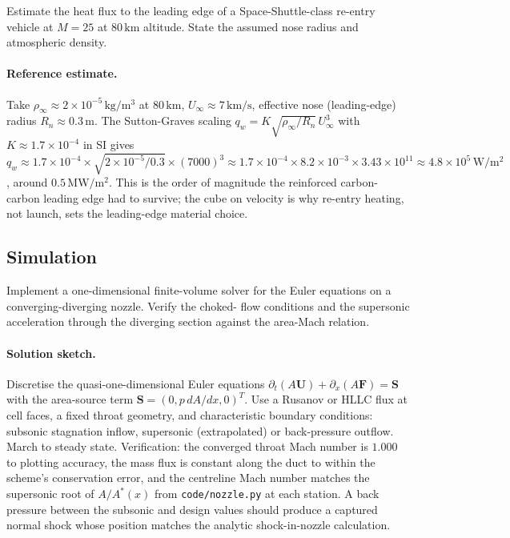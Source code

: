 \begin{exercise}
Estimate the heat flux to the leading edge of a Space-Shuttle-class
re-entry vehicle at $M = 25$ at $80\,\si{\kilo\meter}$ altitude.
State the assumed nose radius and atmospheric density.
\paragraph{Reference estimate.} Take $\rho_\infty \approx 2\times
10^{-5}\,\si{\kilogram\per\meter\cubed}$ at $80\,\si{\kilo\meter}$,
$U_\infty \approx 7\,\si{\kilo\meter\per\second}$, effective nose
(leading-edge) radius $R_n \approx 0.3\,\si{\meter}$. The Sutton-Graves
scaling $q_w = K\sqrt{\rho_\infty/R_n}\,U_\infty^3$ with $K \approx
1.7\times 10^{-4}$ in SI gives $q_w \approx 1.7\times 10^{-4}\times
\sqrt{2\times 10^{-5}/0.3}\times(7000)^3 \approx 1.7\times 10^{-4}
\times 8.2\times 10^{-3}\times 3.43\times 10^{11} \approx 4.8\times
10^{5}\,\si{\watt\per\meter\squared}$, around $0.5\,\si{\mega\watt\per
\meter\squared}$. This is the order of magnitude the reinforced
carbon-carbon leading edge had to survive; the cube on velocity is why
re-entry heating, not launch, sets the leading-edge material choice.
\end{exercise}

\subsection*{Simulation}

\begin{exercise}
Implement a one-dimensional finite-volume solver for the Euler
equations on a converging-diverging nozzle. Verify the choked-
flow conditions and the supersonic acceleration through the
diverging section against the area-Mach relation.
\paragraph{Solution sketch.} Discretise the quasi-one-dimensional
Euler equations $\partial_t(A\mathbf U) + \partial_x(A\mathbf F) =
\mathbf S$ with the area-source term $\mathbf S = (0, p\,dA/dx, 0)^T$.
Use a Rusanov or HLLC flux at cell faces, a fixed throat geometry, and
characteristic boundary conditions: subsonic stagnation inflow,
supersonic (extrapolated) or back-pressure outflow. March to steady
state. Verification: the converged throat Mach number is $1.000$ to
plotting accuracy, the mass flux is constant along the duct to within
the scheme's conservation error, and the centreline Mach number
matches the supersonic root of $A/A^*(x)$ from \texttt{code/nozzle.py}
at each station. A back pressure between the subsonic and design
values should produce a captured normal shock whose position matches
the analytic shock-in-nozzle calculation.
\end{exercise}

